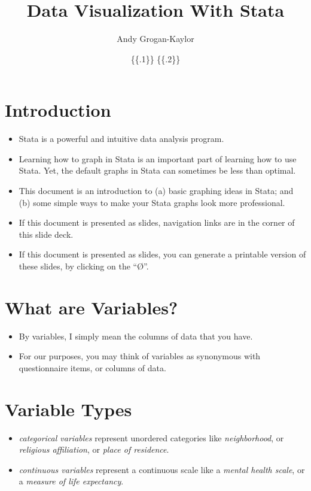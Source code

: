 \documentclass[
]{article}
\title{Data Visualization With Stata}
\author{Andy Grogan-Kaylor}
\date{\{\{.1\}\} \{\{.2\}\}}
\providecommand{\tightlist}{%
  \setlength{\itemsep}{0pt}\setlength{\parskip}{0pt}}
\begin{document}
\maketitle

\hypertarget{introduction}{%
\section{Introduction}\label{introduction}}

\begin{itemize}
\tightlist
\item
  Stata is a powerful and intuitive data analysis program.
\item
  Learning how to graph in Stata is an important part of learning how to
  use Stata. Yet, the default graphs in Stata can sometimes be less than
  optimal.
\item
  This document is an introduction to (a) basic graphing ideas in Stata;
  and (b) some simple ways to make your Stata graphs look more
  professional.
\item
  If this document is presented as slides, navigation links are in the
  corner of this slide deck.
\item
  If this document is presented as slides, you can generate a printable
  version of these slides, by clicking on the ``Ø''.
\end{itemize}

\hypertarget{what-are-variables}{%
\section{What are Variables?}\label{what-are-variables}}

\begin{itemize}
\tightlist
\item
  By variables, I simply mean the columns of data that you have.
\item
  For our purposes, you may think of variables as synonymous with
  questionnaire items, or columns of data.
\end{itemize}

\hypertarget{variable-types}{%
\section{Variable Types}\label{variable-types}}

\begin{itemize}
\tightlist
\item
  \emph{categorical variables} represent unordered categories like
  \emph{neighborhood}, or \emph{religious affiliation}, or \emph{place
  of residence}.
\item
  \emph{continuous variables} represent a continuous scale like a
  \emph{mental health scale}, or a \emph{measure of life expectancy}.
\end{itemize}
\end{document}
